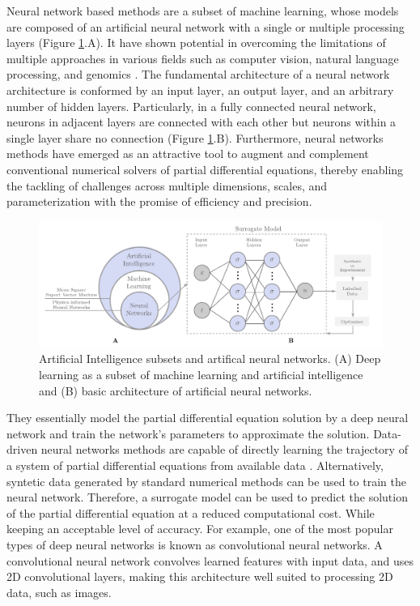 \documentclass[11pt,twoside]{article}
\begin{document}
Neural network based methods are a subset of machine learning, whose models are composed of an artificial neural 
network with a single or multiple processing layers (Figure \ref{deep_learning_subset_architecture}.A). It have 
shown potential in overcoming the limitations of multiple approaches in various fields such as computer vision, 
natural language processing, and genomics \citep{lecun_deep_2015,goodfellow_deep_2016}. The fundamental architecture 
of a neural network architecture is conformed by an input layer, an output layer, and an arbitrary number of hidden 
layers. Particularly, in a fully connected neural network, neurons in adjacent layers are connected with each other 
but neurons within a single layer share no connection (Figure \ref{deep_learning_subset_architecture}.B). Furthermore, 
neural networks methods have emerged as an attractive tool to augment and complement conventional numerical solvers 
of partial differential equations, thereby enabling the tackling of challenges across multiple dimensions, scales, 
and parameterization with the promise of efficiency and precision. 

\begin{figure}[h]
\centering
    \includegraphics[width=1.0\textwidth]{figs/artificial_intelligence_subsets.pdf}
    \caption{Artificial Intelligence subsets and artifical neural networks. (A) Deep learning as a subset of machine 
    learning and artificial intelligence and (B) basic architecture of artificial neural networks.}    
    \label{deep_learning_subset_architecture}
\end{figure}

They essentially model the partial differential equation solution by a deep neural network and train the 
network’s parameters to approximate the solution. Data-driven neural networks methods are capable of directly 
learning the trajectory of a system of partial differential equations from available data 
\citep{li_neural_2020,li_fourier_2021}. Alternatively, syntetic data generated by standard numerical 
methods can be used to train the neural network. Therefore, a surrogate model can be used to predict the
solution of the partial differential equation at a reduced computational cost. While keeping an acceptable
level of accuracy.  For example, one of the most popular types of deep neural networks is known as 
convolutional neural networks. A convolutional neural network convolves learned features with input data, 
and uses 2D convolutional layers, making this architecture well suited to processing 2D data, such as images.
\end{document}
